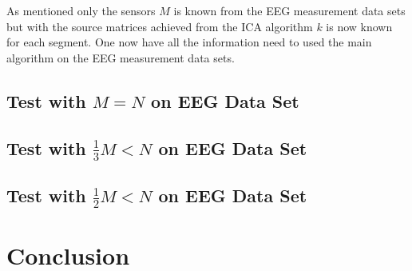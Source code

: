 As mentioned only the sensors $M$ is known from the EEG measurement data sets but with the source matrices achieved from the ICA algorithm $k$ is now known for each segment. One now have all the information need to used the main algorithm on the EEG measurement data sets. 

\subsection{Test with $M=N$ on EEG Data Set}

\subsection{Test with $\frac{1}{3} M<N$ on EEG Data Set}

\subsection{Test with $\frac{1}{2} M<N$ on EEG Data Set}

\section{Conclusion}